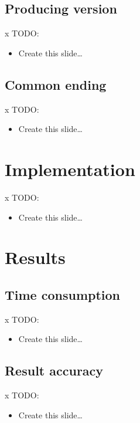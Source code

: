 \documentclass{beamer}
\newlength{\wideitemsep}
\let\olditem\item
\renewcommand{\item}{\setlength{\itemsep}{\wideitemsep}\olditem}
\begin{document}
\subsection{Producing version}
\begin{frame}{x}{}
TODO:
\begin{itemize}
\item Create this slide\ldots
\end{itemize}
\end{frame}


\subsection{Common ending}
\begin{frame}{x}{}
TODO:
\begin{itemize}
\item Create this slide\ldots
\end{itemize}
\end{frame}



\section{Implementation}
\begin{frame}{x}{}
TODO:
\begin{itemize}
\item Create this slide\ldots
\end{itemize}
\end{frame}



\section{Results}
\subsection{Time consumption}
\begin{frame}{x}{}
TODO:
\begin{itemize}
\item Create this slide\ldots
\end{itemize}
\end{frame}


\subsection{Result accuracy}
\begin{frame}{x}{}
TODO:
\begin{itemize}
\item Create this slide\ldots
\end{itemize}
\end{frame}
\end{document}
